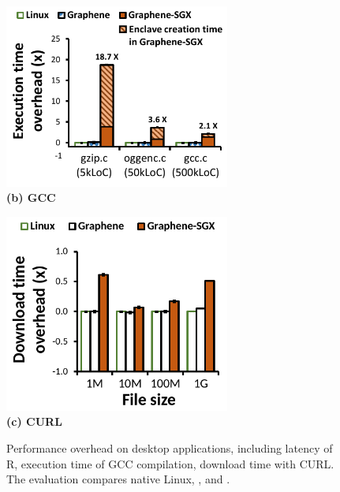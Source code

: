 \begin{figure}[t!]
\centering
\footnotesize
\begin{minipage}{.49\textwidth}
\centering
\includegraphics[width=20em]{sgx/gcc-overhead}\\
\vspace{3pt}
{\bf (b) GCC}
\end{minipage}
\begin{minipage}{.49\textwidth}
\centering
\includegraphics[width=20em]{sgx/curl-overhead}\\
\vspace{3pt}
{\bf (c) CURL}
\end{minipage}
\caption{Performance overhead on desktop applications, including latency of R, execution time of GCC compilation, download time with CURL. The evaluation compares native Linux, \graphene{}, and \graphenesgx{}.} %
\label{fig:desktop-overhead}
\end{figure}


